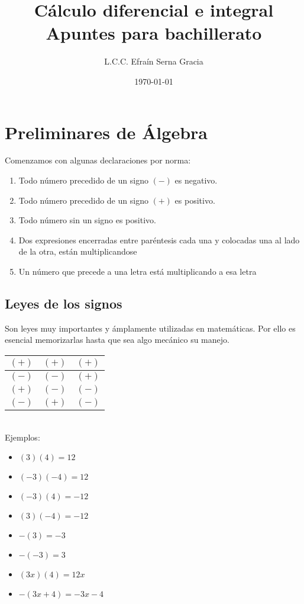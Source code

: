 \documentclass[12pt,spanish,lettersize,twocolumn]{article}
\title{%
  \color{Maroon}C\'alculo diferencial e integral \\
\large Apuntes para bachillerato}
\author{L.C.C. Efra\'in Serna Gracia}
\date{\color{gray}\today}
\begin{document}
\maketitle
\section{Preliminares de \'Algebra}
Comenzamos con algunas declaraciones por norma:\\
\begin{enumerate}
\item Todo n\'umero precedido de un signo $(-)$ es negativo.\\
\item Todo n\'umero precedido de un signo $(+)$ es positivo.\\
\item Todo n\'umero sin un signo es positivo.\\
\item Dos expresiones encerradas entre par\'entesis cada una y colocadas una al lado de la otra, est\'an multiplicandose
\item Un n\'umero que precede a una letra est\'a multiplicando a esa letra
\end{enumerate}
\subsection{Leyes de los signos}
Son leyes muy importantes y \'amplamente utilizadas en matem\'aticas. Por ello es esencial memorizarlas hasta que sea algo mec\'anico su manejo.\\
\begin{tabular}{c|c|c}
$(+)$ & $(+)$ & $(+)$\\
\hline
$(-)$ & $(-)$ & $(+)$\\
\hline
$(+)$ & $(-)$ & $(-)$\\
\hline
$(-)$ & $(+)$ & $(-)$\\
\end{tabular}\\
Ejemplos:\\
\begin{itemize}
\item $(3)(4) = 12$
\item $(-3)(-4) = 12$
\item $(-3)(4) = -12$
\item $(3)(-4) = -12$
\item $-(3) = -3$
\item $-(-3) = 3$
\item $(3x)(4) = 12x$
\item $-(3x+4) = -3x-4$
\end{itemize}
\end{document}
